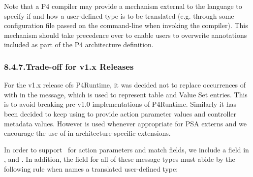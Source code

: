 \documentclass[11pt]{article}
\begin{document}
{%
\noindent{}Note that a P4 compiler may provide a mechanism external to the language to
specify if and how a user-defined type is to be translated (e.g. through some
configuration file passed on the command-line when invoking the compiler). This
mechanism should take precedence over  to enable users
to overwrite annotations included as part of the P4 architecture definition.%

\subsubsection{8.4.7.\hspace*{0.5em}Trade-off for v1.x Releases}\label{sec-trade-off-for-v1x-releases}%

\noindent{}For the v1.x release ofs P4Runtime, it was decided not to replace occurrences of
 with  in the  message, which is used to
represent table and Value Set entries. This is to avoid breaking pre-v1.0
implementations of P4Runtime. Similarly it has been decided to keep using
 to provide action parameter values and controller metadata
values. However  is used whenever appropriate for PSA externs and we
encourage the use of  in architecture-specific extensions.%

In order to support~ for action
parameters and match fields, we include a  field in
,  and
. In addition, the 
field for all of these message types must abide by the following rule when
 names a translated user-defined type:%

}
\end{document}
